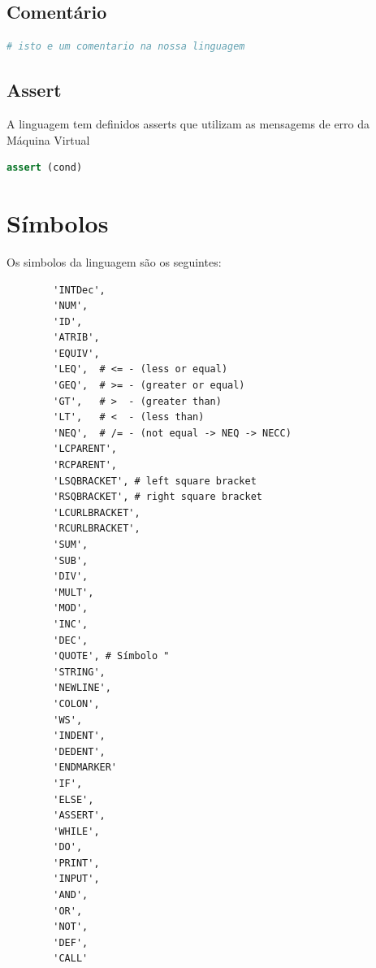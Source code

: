 \documentclass[11pt,a4paper]{report}
\begin{document}
    \subsection{Comentário}
    \begin{lstlisting}[language=Python]
        # isto e um comentario na nossa linguagem
    \end{lstlisting}

    \subsection{Assert}
    A linguagem tem definidos asserts que utilizam as mensagems de erro da Máquina Virtual
    \begin{lstlisting}[language=Python]
        assert (cond)
    \end{lstlisting}

    \section{Símbolos}
    Os simbolos da linguagem são os seguintes:
    \begin{verbatim}
        'INTDec',
        'NUM',
        'ID',
        'ATRIB',
        'EQUIV',
        'LEQ',  # <= - (less or equal)
        'GEQ',  # >= - (greater or equal)
        'GT',   # >  - (greater than)
        'LT',   # <  - (less than)
        'NEQ',  # /= - (not equal -> NEQ -> NECC)
        'LCPARENT',
        'RCPARENT',
        'LSQBRACKET', # left square bracket
        'RSQBRACKET', # right square bracket
        'LCURLBRACKET',
        'RCURLBRACKET',
        'SUM',
        'SUB',
        'DIV',
        'MULT',
        'MOD',
        'INC',
        'DEC',
        'QUOTE', # Símbolo "
        'STRING',
        'NEWLINE',
        'COLON',
        'WS',
        'INDENT',
        'DEDENT',
        'ENDMARKER'
        'IF',
        'ELSE',
        'ASSERT',
        'WHILE',
        'DO',
        'PRINT',
        'INPUT',
        'AND',
        'OR',
        'NOT',
        'DEF',
        'CALL'
    \end{verbatim}
\end{document}
